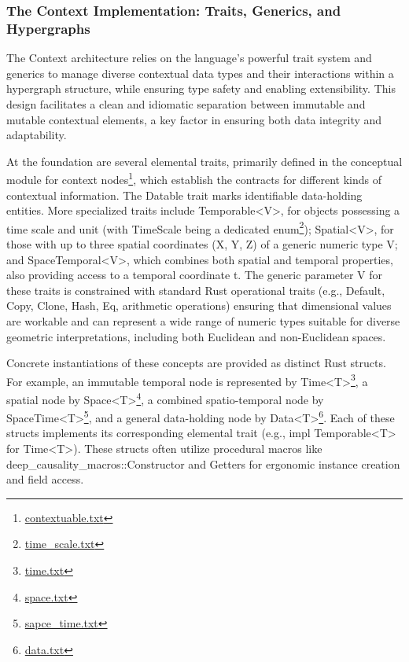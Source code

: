\newpage

\subsubsection{The Context Implementation: Traits, Generics, and Hypergraphs}
\label{subsubsec:context_engine_implementation}

The Context architecture relies on the language's powerful trait system and generics to manage diverse contextual data types and their interactions within a hypergraph structure, while ensuring type safety and enabling extensibility. This design facilitates a clean and idiomatic separation between immutable and mutable contextual elements, a key factor in ensuring both data integrity and adaptability.

At the foundation are several elemental traits, primarily defined in the conceptual module for context nodes\footnote{\url{contextuable.txt}}, which establish the contracts for different kinds of contextual information. The Datable trait marks identifiable data-holding entities. More specialized traits include Temporable<V>, for objects possessing a time scale and unit (with TimeScale being a dedicated enum\footnote{\url{time_scale.txt}}); Spatial<V>, for those with up to three spatial coordinates (X, Y, Z) of a generic numeric type V; and SpaceTemporal<V>, which combines both spatial and temporal properties, also providing access to a temporal coordinate t. The generic parameter V for these traits is constrained with standard Rust operational traits (e.g., Default, Copy, Clone, Hash, Eq, arithmetic operations) ensuring that dimensional values are workable and can represent a wide range of numeric types suitable for diverse geometric interpretations, including both Euclidean and non-Euclidean spaces.

Concrete instantiations of these concepts are provided as distinct Rust structs. For example, an immutable temporal node is represented by Time<T>\footnote{\url{time.txt}}, a spatial node by Space<T>\footnote{\url{space.txt}}, a combined spatio-temporal node by SpaceTime<T>\footnote{\url{sapce_time.txt}}, and a general data-holding node by Data<T>\footnote{\url{data.txt}}. Each of these structs implements its corresponding elemental trait (e.g., impl Temporable<T> for Time<T>). These structs often utilize procedural macros like deep\_causality\_macros::Constructor and Getters for ergonomic instance creation and field access.


